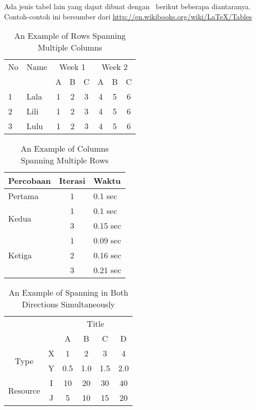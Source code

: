 Ada jenis tabel lain yang dapat dibuat dengan \latex~berikut beberapa diantaranya.
Contoh-contoh ini bersumber dari \url{http://en.wikibooks.org/wiki/LaTeX/Tables}

\begin{table}
	\centering
	\caption{An Example of Rows Spanning Multiple Columns}
	\label{row.spanning}
	\begin{tabular}{|l|l|*{6}{c|}}
		\hline %
		No & Name & \multicolumn{3}{|c|}{Week 1} & \multicolumn{3}{|c|}{Week 2} \\
		\cline{3-8} %
		& & A & B & C & A & B & C\\
		\hline
		1 & Lala & 1 & 2 & 3 & 4 & 5 & 6\\
		2 & Lili & 1 & 2 & 3 & 4 & 5 & 6\\
		3 & Lulu & 1 & 2 & 3 & 4 & 5 & 6\\
		\hline
	\end{tabular}
\end{table}

\begin{table}
	\centering
	\caption{An Example of Columns Spanning Multiple Rows}
	\label{column.spanning}
	\begin{tabular}{|l|c|l|}
		\hline
		Percobaan & Iterasi & Waktu \\
		\hline
		Pertama & 1 & 0.1 sec \\ \hline
		\multirow{2}{*}{Kedua} & 1 & 0.1 sec \\
		& 3 & 0.15 sec \\
		\hline
		\multirow{3}{*}{Ketiga} & 1 & 0.09 sec \\
		& 2 & 0.16 sec \\
		& 3 & 0.21 sec \\
		\hline
	\end{tabular}
\end{table}

\begin{table}
	\centering
	\caption{An Example of Spanning in Both Directions Simultaneously}
	\label{mix.spanning}
	\begin{tabular}{cc|c|c|c|c|}
		\cline{3-6}
		& & \multicolumn{4}{|c|}{Title} \\ \cline{3-6}
		& & A & B & C & D \\ \hline
		\multicolumn{1}{|c|}{\multirow{2}{*}{Type}} &
		\multicolumn{1}{|c|}{X} & 1 & 2 & 3 & 4\\ \cline{2-6}
		\multicolumn{1}{|c|}{}                        &
		\multicolumn{1}{|c|}{Y} & 0.5 & 1.0 & 1.5 & 2.0\\ \cline{1-6}
		\multicolumn{1}{|c|}{\multirow{2}{*}{Resource}} &
		\multicolumn{1}{|c|}{I} & 10 & 20 & 30 & 40\\ \cline{2-6}
		\multicolumn{1}{|c|}{}                        &
		\multicolumn{1}{|c|}{J} & 5 & 10 & 15 & 20\\ \cline{1-6}
	\end{tabular}
\end{table}


